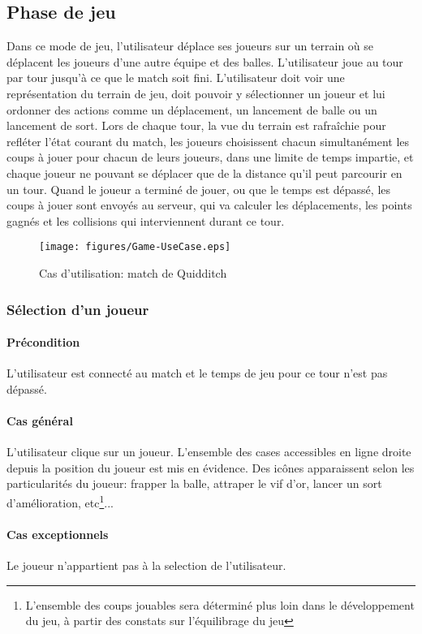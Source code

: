 \subsection{Phase de jeu}
Dans ce mode de jeu, l'utilisateur déplace ses joueurs sur un terrain où se
déplacent les joueurs d'une autre équipe et des balles. L'utilisateur joue au
tour par tour jusqu'à ce que le match soit fini. L'utilisateur doit voir une 
représentation du terrain de jeu, doit pouvoir y sélectionner un joueur et lui 
ordonner des actions comme un déplacement, un lancement de balle ou un lancement 
de sort. Lors de chaque tour, la vue du terrain est rafraîchie pour refléter 
l'état courant du match, les joueurs choisissent chacun simultanément les coups
à jouer pour chacun de leurs joueurs, dans une limite de temps impartie, et 
chaque joueur ne pouvant se déplacer que de la distance qu'il peut parcourir en
un tour. Quand le joueur a terminé de jouer, ou que le temps est dépassé, les
coups à jouer sont envoyés au serveur, qui va calculer les déplacements, les 
points gagnés et les collisions qui interviennent durant ce tour.

\begin{figure}[h!]
    \centering
    \texttt{[image: figures/Game-UseCase.eps]}
    \caption{\label{fig:UC:game} Cas d'utilisation: match de Quidditch}
\end{figure}

\subsubsection{Sélection d'un joueur}
    \label{UC:selectPlayerOnPitch}
    \paragraph{Précondition} L'utilisateur est connecté au match et le temps de jeu pour ce tour n'est pas dépassé.
    \paragraph{Cas général} L'utilisateur clique sur un joueur. L'ensemble des cases accessibles en ligne droite depuis la position du joueur est mis en évidence. Des icônes apparaissent selon les particularités du joueur: frapper la balle, attraper le vif d'or, lancer un sort d'amélioration, etc\footnote{L'ensemble des coups jouables sera déterminé plus loin dans le développement du jeu, à partir des constats sur l'équilibrage du jeu}...
    \paragraph{Cas exceptionnels} Le \gls{joueur} n'appartient pas à la \gls{selection} de l'\gls{utilisateur}.
